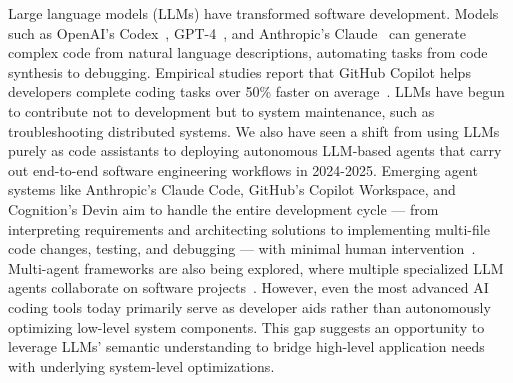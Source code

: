 Large language models (LLMs) have transformed software development. Models such as OpenAI’s Codex~\cite{chen2021codex}, GPT-4~\cite{openai2023gpt4}, and Anthropic’s Claude~\cite{anthropic2024claude} can generate complex code from natural language descriptions, automating tasks from code synthesis to debugging. Empirical studies report that GitHub Copilot  helps developers complete coding tasks over 50\% faster on average~\cite{peng2023impact}. 
LLMs have begun to contribute not to development but to system maintenance, such as troubleshooting distributed systems\cite{de2025llm}.
We also have seen a shift from using LLMs purely as code assistants to deploying autonomous LLM-based agents that carry out end-to-end software engineering workflows in 2024-2025. Emerging agent systems like Anthropic’s Claude Code, GitHub’s Copilot Workspace, and Cognition’s Devin aim to handle the entire development cycle — from interpreting requirements and architecting solutions to implementing multi-file code changes, testing, and debugging — with minimal human intervention~\cite{dohmke2024copilotworkspace,sharma2024devin}. Multi-agent frameworks are also being explored, where multiple specialized LLM agents collaborate on software projects~\cite{qian2024chatdev,hong2023metagpt}. However, even the most advanced AI coding tools today primarily serve as developer aids rather than autonomously optimizing low-level system components. This gap suggests an opportunity to leverage LLMs’ semantic understanding to bridge high-level application needs with underlying system-level optimizations. 